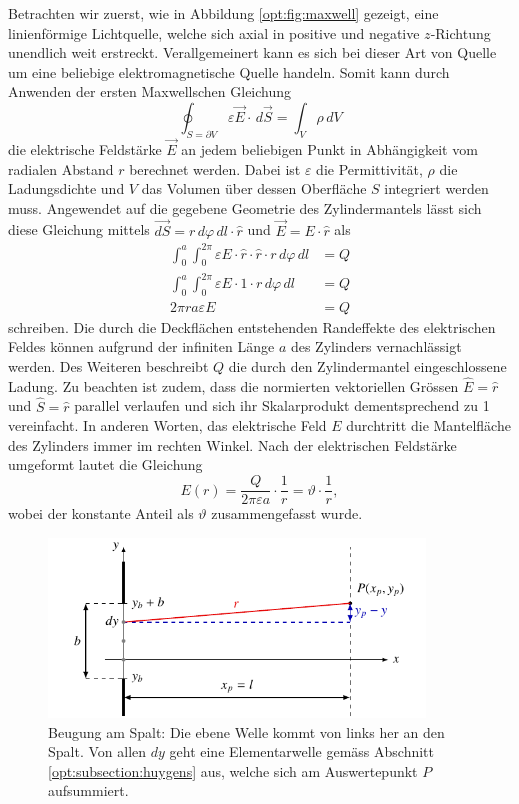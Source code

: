 Betrachten wir zuerst, wie in Abbildung \ref{opt:fig:maxwell} gezeigt, eine linienförmige Lichtquelle, welche sich axial in positive und negative $z$-Richtung unendlich weit erstreckt.
Verallgemeinert kann es sich bei dieser Art von Quelle um eine beliebige elektromagnetische Quelle handeln.
Somit kann durch Anwenden der ersten Maxwellschen Gleichung
\begin{equation*}
\oint_{S=\partial V} \varepsilon\vec{E} \cdot\, d\vec{S}
=
\int_{V}\rho\, dV
\end{equation*}
die elektrische Feldstärke $\vec{E}$ an jedem beliebigen Punkt in Abhängigkeit vom radialen Abstand $r$ berechnet werden.
Dabei ist $\varepsilon$ die Permittivität, $\rho$ die Ladungsdichte und $V$ das Volumen über dessen Oberfläche $S$ integriert werden muss.
Angewendet auf die gegebene Geometrie des Zylindermantels lässt sich diese Gleichung mittels $\vec{dS} = r\, d\varphi\, dl \cdot \hat{r}$ und $\vec{E} = E \cdot \hat{r}$ als
\begin{align*}
\int_{0}^{a}\int_{0}^{2\pi} \varepsilon E\cdot \hat{r} \cdot \hat{r} \cdot r\, d\varphi\, dl
&=
Q
\\
\int_{0}^{a}\int_{0}^{2\pi} \varepsilon E\cdot 1 \cdot r\, d\varphi\, dl
&=
Q
\\
2\pi ra\varepsilon E
&=
Q
\end{align*}
schreiben.
Die durch die Deckflächen entstehenden Randeffekte des elektrischen Feldes können aufgrund der infiniten Länge $a$ des Zylinders vernachlässigt werden.
Des Weiteren beschreibt $Q$ die durch den Zylindermantel eingeschlossene Ladung.
Zu beachten ist zudem, dass die normierten vektoriellen Grössen $\hat{E} = \hat{r}$ und $\hat{S} = \hat{r}$ parallel verlaufen und sich ihr Skalarprodukt dementsprechend zu 1 vereinfacht.
In anderen Worten, das elektrische Feld $E$ durchtritt die Mantelfläche des Zylinders immer im rechten Winkel.
Nach der elektrischen Feldstärke umgeformt lautet die Gleichung
\begin{equation}
E(r)
=
\frac{Q}{2\pi\varepsilon a} \cdot \frac{1}{r}
=
\vartheta \cdot \frac{1}{r}
,
\label{opt:equation:electric_field}
\end{equation}
wobei der konstante Anteil als $\vartheta$ zusammengefasst wurde.

\begin{figure}
    \centering
    \includegraphics[width=100mm]{papers/opt/images/derivation.pdf}
    \caption{Beugung am Spalt: Die ebene Welle kommt von links her an den Spalt. 
    Von allen $dy$ geht eine Elementarwelle gemäss Abschnitt \ref{opt:subsection:huygens} aus, welche sich am Auswertepunkt $P$ aufsummiert.}
    \label{opt:fig:geometricalShape}
\end{figure}

